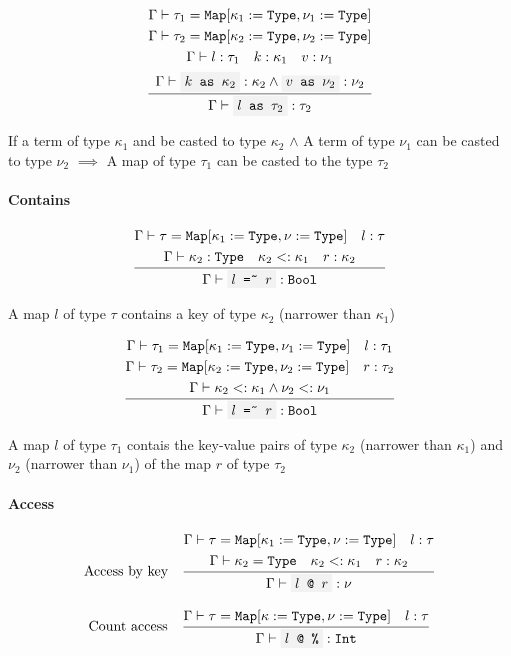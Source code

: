 \documentclass[11pt]{report}
\newcommand{\infrule}[3][gathered]{\frac{\begin{#1}#2\end{#1}}{\begin{gathered}#3\end{gathered}}}
\newcommand{\then}{\vdash}
\newcommand{\code}[1]{\texttt{\colorbox{gray!10}{#1}}}
\newcommand{\narr}{<:}
\newcommand{\Type}{\texttt{Type}}
\newcommand{\Bool}{\texttt{Bool}}
\newcommand{\Int}{\texttt{Int}}
\newcommand{\Map}{\texttt{Map}}
\newcommand{\Env}{\Gamma}
\theoremstyle{definition}
\begin{document}
\[
	\infrule{
		\Env\then \tau_1 = \Map[\kappa_1:=\Type,\nu_1:=\Type] \\*
		\Env\then \tau_2 = \Map[\kappa_2:=\Type,\nu_2:=\Type] \\*
		\Env\then l:\tau_1 \quad k:\kappa_1 \quad v:\nu_1 \\*
		\Env\then \code{$k$ as $\kappa_2$} : \kappa_2 \land \code{$v$ as $\nu_2$} : \nu_2
	}{
		\Env\then \code{$l$ as $\tau_2$} : \tau_2
	}
\]

If a term of type $\kappa_1$ and be casted to type $\kappa_2$ $\land$ A term of
type $\nu_1$ can be casted to type $\nu_2$ $\implies$ A map of type $\tau_1$
can be casted to the type $\tau_2$


\paragraph{Contains}

\[
	\infrule{
		\Env\then \tau = \Map[\kappa_1:=\Type,\nu:=\Type] \quad l:\tau \\*
		\Env\then \kappa_2:\Type \quad \kappa_2 \narr \kappa_1 \quad r:\kappa_2
	}{
		\Env\then \code{$l$ =\~{} $r$} : \Bool
	}
\]

A map $l$ of type $\tau$ contains a key of type $\kappa_2$ (narrower than
$\kappa_1$)

\[
	\infrule{
		\Env\then \tau_1 = \Map[\kappa_1:=\Type,\nu_1:=\Type] \quad l:\tau_1 \\*
		\Env\then \tau_2 = \Map[\kappa_2:=\Type,\nu_2:=\Type] \quad r:\tau_2 \\*
		\Env\then \kappa_2 \narr \kappa_1 \land \nu_2 \narr \nu_1
	}{
		\Env\then \code{$l$ =\~{} $r$} : \Bool
	}
\]

A map $l$ of type $\tau_1$ contais the key-value pairs of type $\kappa_2$
(narrower than $\kappa_1$) and $\nu_2$ (narrower than $\nu_1$) of the map $r$
of type $\tau_2$

\paragraph{Access}

\[
	\text{Access by key}\quad
	\infrule{
		\Env\then \tau = \Map[\kappa_1:=\Type,\nu:=\Type] \quad l:\tau \\*
		\Env\then \kappa_2 = \Type \quad \kappa_2 \narr \kappa_1 \quad r:\kappa_2
	}{
		\Env\then \code{$l$ @ $r$}: \nu
	}
\]

\[
	\text{Count access}\quad
	\infrule{
		\Env\then \tau = \Map[\kappa:=\Type,\nu:=\Type] \quad l:\tau \\*
	}{
		\Env\then \code{$l$ @ \%}: \Int
	}
\]
\end{document}
